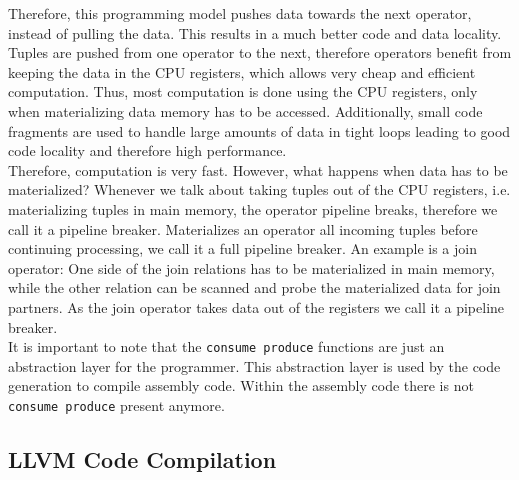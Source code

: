 Therefore, this programming model pushes data towards the next operator, instead of pulling the data. This results in a much better code and data locality. Tuples are pushed from one operator to the next, therefore operators benefit from keeping the data in the CPU registers, which allows very cheap and efficient computation. Thus, most computation is done using the CPU registers, only when materializing data memory has to be accessed. Additionally, small code fragments are used to handle large amounts of data in tight loops leading to good code locality and therefore high performance.
\\
Therefore, computation is very fast. However, what happens when data has to be materialized? Whenever we talk about taking tuples out of the CPU registers, i.e. materializing tuples in main memory, the operator pipeline breaks, therefore we call it a pipeline breaker. Materializes an operator all incoming tuples before continuing processing, we call it a full pipeline breaker. An example is a join operator: One side of the join relations has to be materialized in main memory,  while the other relation can be scanned and probe the materialized data for join partners. As the join operator takes data out of the registers we call it a pipeline breaker.
\\
It is important to note that the \texttt{consume produce} functions are just an abstraction layer for the programmer. This abstraction layer is used by the code generation to compile assembly code. Within the assembly code there is not \texttt{consume produce} present anymore.

\subsection{LLVM Code Compilation}

